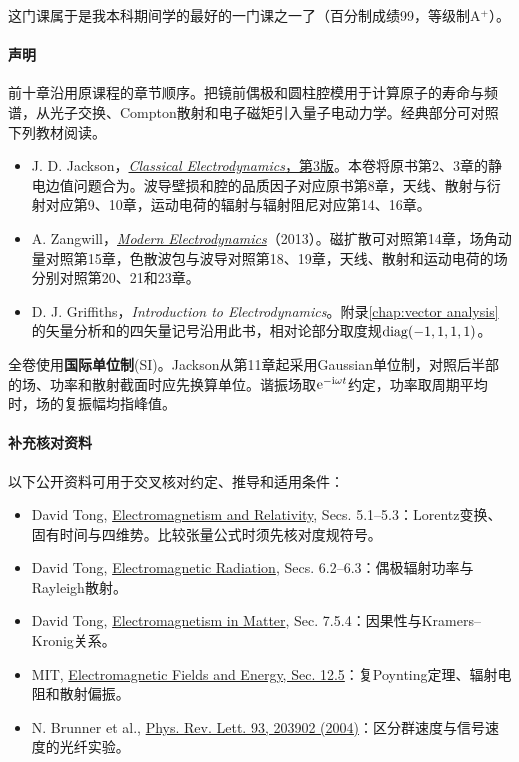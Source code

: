 \preface

这门课属于是我本科期间学的最好的一门课之一了（百分制成绩99，等级制A$^+$）。

\paragraph{声明}

前十章沿用原课程的章节顺序。把镜前偶极和圆柱腔模用于计算原子的寿命与频谱，从光子交换、Compton散射和电子磁矩引入量子电动力学。经典部分可对照下列教材阅读。
\begin{itemize}
    \item J. D. Jackson，\href{https://www.wiley.com/en-us/classical-electrodynamics-3rd-edition-p-9780471309321}{\textit{Classical Electrodynamics}，第3版}。本卷将原书第2、3章的静电边值问题合为。波导壁损和腔的品质因子对应原书第8章，天线、散射与衍射对应第9、10章，运动电荷的辐射与辐射阻尼对应第14、16章。
    \item A. Zangwill，\href{https://www.cambridge.org/highereducation/books/modern-electrodynamics/E5448C70CBF3651B2056F28EBF859AE9}{\textit{Modern Electrodynamics}}（2013）。磁扩散可对照第14章，场角动量对照第15章，色散波包与波导对照第18、19章，天线、散射和运动电荷的场分别对照第20、21和23章。
    \item D. J. Griffiths，\textit{Introduction to Electrodynamics}。附录\ref{chap:vector analysis}的矢量分析和的四矢量记号沿用此书，相对论部分取度规$\operatorname{diag}(-1,1,1,1)$。
\end{itemize}
全卷使用\textbf{国际单位制}(SI)。Jackson从第11章起采用Gaussian单位制，对照后半部的场、功率和散射截面时应先换算单位。谐振场取$\mathop{}\!\mathrm{e}^{-\mathrm{i}\omega t}$约定，功率取周期平均时，场的复振幅均指峰值。


\paragraph{补充核对资料}
以下公开资料可用于交叉核对约定、推导和适用条件：
\begin{itemize}
    \item David Tong, \href{https://www.damtp.cam.ac.uk/user/tong/em/el4.pdf}{Electromagnetism and Relativity}, Secs. 5.1--5.3：Lorentz变换、固有时间与四维势。比较张量公式时须先核对度规符号。
    \item David Tong, \href{https://www.damtp.cam.ac.uk/user/tong/em/el5.pdf}{Electromagnetic Radiation}, Secs. 6.2--6.3：偶极辐射功率与Rayleigh散射。
    \item David Tong, \href{https://www.damtp.cam.ac.uk/user/tong/em/el6.pdf}{Electromagnetism in Matter}, Sec. 7.5.4：因果性与Kramers--Kronig关系。
    \item MIT, \href{https://web.mit.edu/6.013_book/www/chapter12/12.5.html}{Electromagnetic Fields and Energy, Sec. 12.5}：复Poynting定理、辐射电阻和散射偏振。
    \item N. Brunner et al., \href{https://doi.org/10.1103/PhysRevLett.93.203902}{Phys. Rev. Lett. 93, 203902 (2004)}：区分群速度与信号速度的光纤实验。
\end{itemize}

